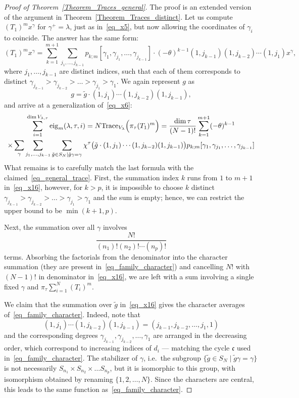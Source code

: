 \begin{proof}[Proof of Theorem~\ref{Theorem_Traces_general}]
The proof is an extended version of the argument in Theorem~\ref{Theorem_Traces_distinct}. Let us compute $(T_1)^m x^{\gamma}$ for $\gamma^+=\lambda$, just as in~\eqref{eq_x5}, but now allowing the coordinates of $\gamma_i$ to coincide. The answer has the same form:
\begin{equation}
 (T_1)^m x^{\gamma}=\sum_{k=1}^{m+1}\sum_{j_1,\dots,j_{k-1}} p_{k;m}[\gamma_1,\gamma_{j_1},\dots,\gamma_{j_{k-1}}]\cdot  (-\theta)^{k-1}(1,j_{k-1})(1, j_{k-2})\cdots (1,j_{1}) x^{\gamma},
\end{equation}
where $j_1,\dots,j_{k-1}$ are distinct indices, such that each of them corresponds to distinct $\gamma_{j_{k-1}}>\gamma_{j_{k-2}}>\dots>\gamma_{j_{1}}>\gamma_1$. We again represent $g$ as
$$
 g=\tilde g\cdot  (1,j_{1})  \cdots (1,j_{k-2})(1, j_{k-1}),
$$
and arrive at a generalization of~\eqref{eq_x6}:
\begin{multline}
\label{eq_x16}
  \sum_{i=1}^{\dim V_{\lambda,\tau}} \mathrm{eig}_m(\lambda,\tau,i) =N \mathrm{Trace}_{V_{\lambda}} \Bigl( \pi_\tau (T_1)^m\Bigr)= \frac{\dim \tau}{(N-1)!}  \sum_{k=1}^{m+1} (-\theta)^{k-1}
 \\ \times \sum_{\gamma}  \sum_{j_1,\dots,j_{k-1}}  \sum_{\tilde g\in S_N\mid \tilde g\gamma=\gamma} \chi^\tau\bigl(\tilde g \cdot (1,j_{1})  \cdots (1,j_{k-2})(1, j_{k-1}) \bigr)  p_{k;m}[\gamma_1,\gamma_{j_1},\dots,\gamma_{j_{k-1}}]
\end{multline}
What remains is to carefully match the last formula with the claimed~\eqref{eq_general_trace}. First, the summation index $k$ runs from $1$ to $m+1$ in~\eqref{eq_x16}, however, for $k>p$, it is impossible to choose $k$ distinct $\gamma_{j_{k-1}}>\gamma_{j_{k-2}}>\dots>\gamma_{j_{1}}>\gamma_1$ and the sum is empty; hence, we can restrict the upper bound to be $\min(k+1,p)$.

Next, the summation over all $\gamma$ involves
$$
 \frac{N!}{(n_1)! (n_2)!\cdots (n_p)!}
$$
terms. Absorbing the factorials from the denominator into the character summation (they are present in~\eqref{eq_family_character}) and cancelling $N!$ with $(N-1)!$ in denominator in~\eqref{eq_x16}, we are left with a sum involving a single fixed $\gamma$ and $ \pi_\tau \sum_{i=1}^N (T_i)^m$.

We claim that the summation over $\tilde g$ in~\eqref{eq_x16} gives the character averages of~\eqref{eq_family_character}. Indeed, note that
$$
(1,j_{1})  \cdots (1,j_{k-2})(1, j_{k-1})=(j_{k-1}, j_{k-2},\dots,j_{1},1)
$$
and the corresponding degrees $\gamma_{j_{k-1}}, \gamma_{j_{k-2}},\dots,\gamma_{1}$ are arranged in the decreasing order, which correspond to increasing indices of $d_i$ --- matching the cycle $\mathfrak c$ used in~\eqref{eq_family_character}. The stabilizer of $\gamma$, i.e.\ the subgroup $\{\tilde g\in S_N\mid \tilde g\gamma=\gamma\}$ is not necessarily $S_{n_1}\times S_{n_2}\times \dots S_{n_p}$, but it is isomorphic to this group, with isomorphism obtained by renaming $\{1,2,\dots,N\}$. Since the characters are central, this leads to the same function as~\eqref{eq_family_character}.


\end{proof}
